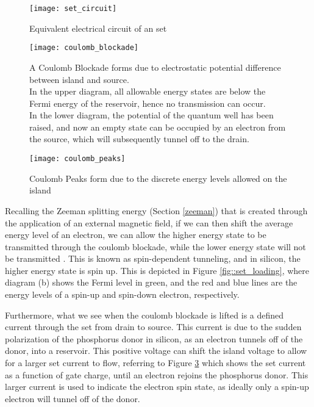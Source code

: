 	\begin{figure}[htbp!]
		\centering
		\texttt{[image: set\_circuit]}
		\caption[Equivalent circuit of an \gls{set}]{Equivalent electrical circuit of an \gls{set}\cite{devoret2000amplifying}}
		\label{fig::set_circuit}
	\end{figure}
	
	\begin{figure}[htbp!]
		\centering
		\texttt{[image: coulomb\_blockade]}
		\caption[A Coulomb Blockade]{A Coulomb Blockade \cite{coulomb_blockade} forms due to electrostatic potential difference between island and source.\\ In the upper diagram, all allowable energy states are below the Fermi energy of the reservoir, hence no transmission can occur.\\ In the lower diagram, the potential of the quantum well has been raised, and now an empty state can be occupied by an electron from the source, which will subsequently tunnel off to the drain.}
		\label{fig::coulomb_blockade}
	\end{figure}
	
	\begin{figure}[htbp!]
		\centering
		\texttt{[image: coulomb\_peaks]}
		\caption[Coulomb Peaks]{Coulomb Peaks form due to the discrete energy levels allowed on the island\cite{elec9705_lecture}}
		\label{fig::coulomb_peaks}
	\end{figure}
	
	
	
	Recalling the Zeeman splitting energy (Section \ref{zeeman}) that is created through the application of an external magnetic field, if we can then shift the average energy level of an electron, we can allow the higher energy state to be transmitted through the coulomb blockade, while the lower energy state will not be transmitted . This is known as spin-dependent tunneling, and in silicon, the higher energy state is spin up. This is depicted in Figure \ref{fig::set_loading}, where diagram (b) shows the Fermi level in green, and the red and blue lines are the energy levels of a spin-up and spin-down electron, respectively. 
	
	Furthermore, what we see when the coulomb blockade is lifted is a defined current through the \gls{set} from drain to source. This current is due to the sudden polarization of the phosphorus donor in silicon, as an electron tunnels off of the donor, into a reservoir. This positive voltage can shift the island voltage to allow for a larger \gls{set} current to flow, referring to Figure \ref{fig::coulomb_peaks} which shows the \gls{set} current as a function of gate charge, until an electron rejoins the phosphorus donor. This larger current is used to indicate the electron spin state, as ideally only a spin-up electron will tunnel off of the donor.
	
